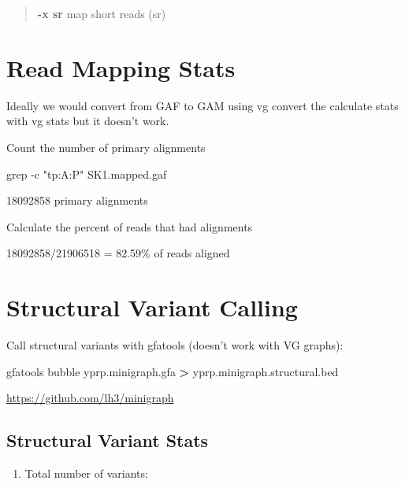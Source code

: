\documentclass[
]{book}
\newenvironment{Shaded}{\begin{snugshade}}{\end{snugshade}}
\newcommand{\AttributeTok}[1]{\textcolor[rgb]{0.77,0.63,0.00}{#1}}
\newcommand{\ExtensionTok}[1]{#1}
\newcommand{\FunctionTok}[1]{\textcolor[rgb]{0.00,0.00,0.00}{#1}}
\newcommand{\NormalTok}[1]{#1}
\newcommand{\OperatorTok}[1]{\textcolor[rgb]{0.81,0.36,0.00}{\textbf{#1}}}
\newcommand{\StringTok}[1]{\textcolor[rgb]{0.31,0.60,0.02}{#1}}
\providecommand{\tightlist}{%
  \setlength{\itemsep}{0pt}\setlength{\parskip}{0pt}}
\begin{document}
\begin{quote}
\textbf{-x sr} map short reads (sr)
\end{quote}

\hypertarget{read-mapping-stats}{%
\section{Read Mapping Stats}\label{read-mapping-stats}}

Ideally we would convert from GAF to GAM using vg convert the calculate stats with vg stats but it doesn't work.

Count the number of primary alignments

\begin{Shaded}
\begin{Highlighting}[]
\FunctionTok{grep} \AttributeTok{{-}c} \StringTok{"tp:A:P"}\NormalTok{ SK1.mapped.gaf}
\end{Highlighting}
\end{Shaded}

18092858 primary alignments

Calculate the percent of reads that had alignments

18092858/21906518 = 82.59\% of reads aligned

\hypertarget{structural-variant-calling}{%
\section{Structural Variant Calling}\label{structural-variant-calling}}

Call structural variants with gfatools (doesn't work with VG graphs):

\begin{Shaded}
\begin{Highlighting}[]
\ExtensionTok{gfatools}\NormalTok{ bubble yprp.minigraph.gfa }\OperatorTok{\textgreater{}}\NormalTok{ yprp.minigraph.structural.bed}
\end{Highlighting}
\end{Shaded}

\url{https://github.com/lh3/minigraph}

\hypertarget{structural-variant-stats}{%
\subsection*{Structural Variant Stats}\label{structural-variant-stats}}

\begin{enumerate}
\def\labelenumi{\arabic{enumi}.}
\tightlist
\item
  Total number of variants:
\end{enumerate}
\end{document}
